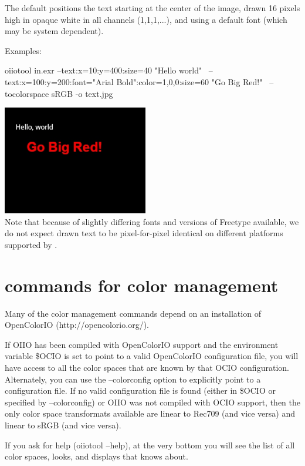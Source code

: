 The default positions the text starting at the center of the image,
drawn 16 pixels high in opaque white in all channels (1,1,1,...), and
using a default font (which may be system dependent).

\noindent Examples:

\begin{smallcode}
    oiiotool in.exr --text:x=10:y=400:size=40 "Hello world" \
        --text:x=100:y=200:font="Arial Bold":color=1,0,0:size=60 "Go Big Red!" \
        --tocolorspace sRGB -o text.jpg
\end{smallcode}
\spc \includegraphics[width=2.5in]{figures/text.jpg}  \\

\noindent Note that because of slightly differing fonts and versions of
Freetype available, we do not expect drawn text to be pixel-for-pixel 
identical on different platforms supported by \product.
\apiend



\section{\oiiotool commands for color management}

Many of the color management commands depend on an installation of
OpenColorIO ({\cf http://opencolorio.org/}).

If OIIO has been compiled with OpenColorIO support and the environment
variable {\cf \$OCIO} is set to point to a valid OpenColorIO configuration
file, you will have access to all the color spaces that are known by that
OCIO configuration.  Alternately, you can use the {\cf --colorconfig} option
to explicitly point to a configuration file. If no  valid configuration file
is found (either in {\cf \$OCIO} or specified by {\cf --colorconfig}) or
OIIO was not compiled with OCIO support, then the only color space
transformats available are {\cf linear} to {\cf Rec709} (and vice versa) and
{\cf linear} to {\cf sRGB} (and vice versa).

If you ask for \oiiotool help ({\cf oiiotool --help}), at the very bottom
you will see the list of all color spaces, looks, and displays that
\oiiotool knows about.

